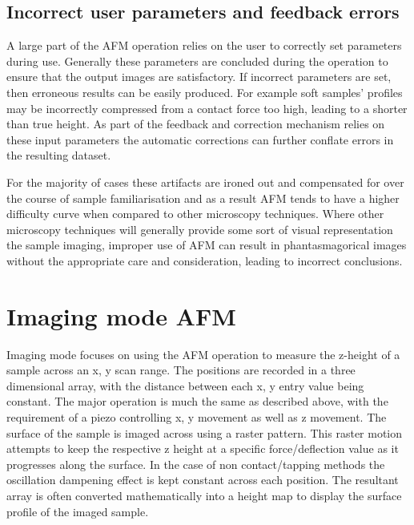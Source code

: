 \subsection{Incorrect user parameters and feedback errors}

A large part of the AFM operation relies on the user to correctly set parameters during use. Generally these parameters are concluded during the operation to ensure that the output images are satisfactory. If incorrect parameters are set, then erroneous results can be easily produced. For example soft samples' profiles may be incorrectly compressed from a contact force too high, leading to a shorter than true height. As part of the feedback and correction mechanism relies on these input parameters the automatic corrections can further conflate errors in the resulting dataset.

For the majority of cases these artifacts are ironed out and compensated for over the course of sample familiarisation and as a result AFM tends to have a higher difficulty curve when compared to other microscopy techniques. Where other microscopy techniques will generally provide some sort of visual representation the sample imaging, improper use of AFM can result in phantasmagorical images without the appropriate care and consideration, leading to incorrect conclusions. \cite{AFMBook1}





\section{Imaging mode AFM}

Imaging mode focuses on using the AFM operation to measure the z-height of a sample across an x, y scan range. The positions are recorded in a three dimensional array, with the distance between each x, y entry value being constant. The major operation is much the same as described above, with the requirement of a piezo controlling x, y movement as well as z movement. The surface of the sample is imaged across using a raster pattern. This raster motion attempts to keep the respective z height at a specific force/deflection value as it progresses along the surface. In the case of non contact/tapping methods the oscillation dampening effect is kept constant across each position. The resultant array is often converted mathematically into a height map to display the surface profile of the imaged sample. 

